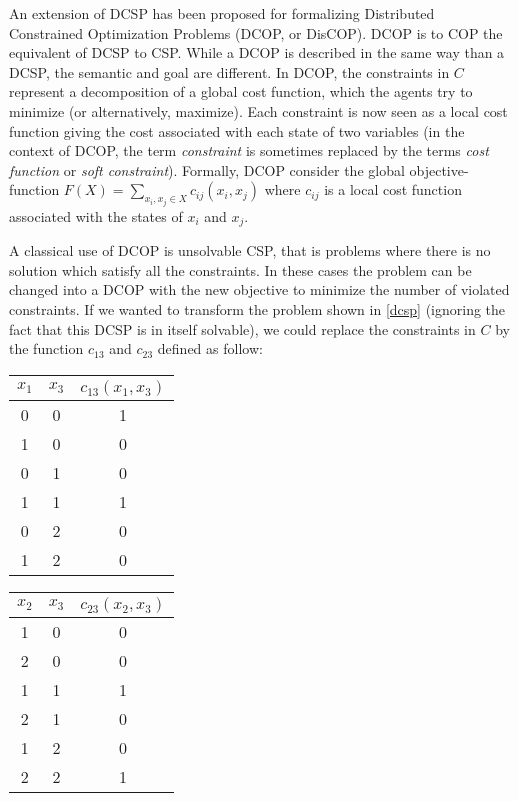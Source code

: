 An extension of DCSP has been proposed for formalizing Distributed Constrained Optimization Problems (DCOP, or DisCOP). DCOP is to COP the equivalent of DCSP to CSP. While a DCOP is described in the same way than a DCSP, the semantic and goal are different.
In DCOP, the constraints in $C$ represent a decomposition of a global cost function, which the agents try to minimize (or alternatively, maximize). Each constraint is now seen as a local cost function giving the cost associated with each state of two variables (in the context of DCOP, the term \emph{constraint} is sometimes replaced by the terms \emph{cost function} or \emph{soft constraint}). Formally, DCOP consider the global objective-function $F(X) = \sum_{x_i, x_j \in X} c_{ij}(x_i,x_j)$ where $c_{ij}$ is a local cost function associated with the states of $x_i$ and $x_j$.

A classical use of DCOP is unsolvable CSP, that is problems where there is no solution which satisfy all the constraints. In these cases the problem can be changed into a DCOP with the new objective to minimize the number of violated constraints. If we wanted to transform the problem shown in \figurename{} \ref{dcsp} (ignoring the fact that this DCSP is in itself solvable), we could replace the constraints in $C$ by the function $c_{13}$ and $c_{23}$ defined as follow:

\begin{center}
\begin{tabular}{ccc}
\textbf{$x_1$}	& \textbf{$x_3$} & \textbf{$c_{13}(x_1,x_3)$}\\
\hline
0   & 0	& 1\\
\hline
1   & 0	& 0\\
\hline
0   & 1	& 0\\
\hline
1   & 1	& 1\\
\hline
0   & 2	& 0\\
\hline
1   & 2	& 0\\
\end{tabular}
\quad
\begin{tabular}{ccc}
\textbf{$x_2$}	& \textbf{$x_3$} & \textbf{$c_{23}(x_2,x_3)$}\\
\hline
1   & 0	& 0\\
\hline
2   & 0	& 0\\
\hline
1   & 1	& 1\\
\hline
2   & 1	& 0\\
\hline
1   & 2	& 0\\
\hline
2   & 2	& 1\\
\end{tabular}
\end{center}

